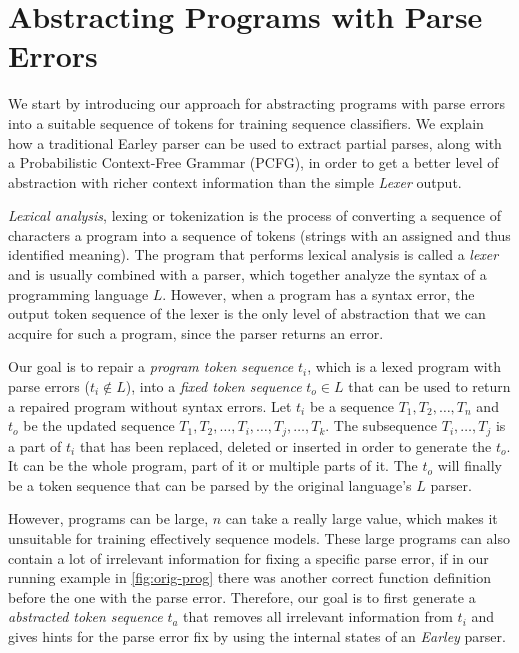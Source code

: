 \section{Abstracting Programs with Parse Errors}
\label{sec:prog-abstract}

We start by introducing our approach for abstracting programs with parse errors
into a suitable sequence of tokens for training sequence classifiers. We explain
how a traditional Earley parser can be used to extract partial parses, along
with a Probabilistic Context-Free Grammar (PCFG), in order to get a better level
of abstraction with richer context information than the simple \emph{Lexer}
output.



\emph{Lexical analysis}, lexing or tokenization is the process of converting a
sequence of characters \ie a program into a sequence of tokens (strings with an
assigned and thus identified meaning). The program that performs lexical
analysis is called a \emph{lexer} and is usually combined with a parser, which
together analyze the syntax of a programming language $L$. However, when a
program has a syntax error, the output token sequence of the lexer is the only
level of abstraction that we can acquire for such a program, since the parser
returns an error.

Our goal is to repair a \emph{program token sequence} $t_i$, which is a lexed
program with parse errors (\ie $t_i \notin L$), into a \emph{fixed token
sequence} $t_o \in L$ that can be used to return a repaired program without
syntax errors. Let $t_i$ be a sequence $T_1, T_2, \dots, T_n$ and $t_o$ be the
updated sequence $T_1, T_2, \dots, T_i, \dots, T_j, \dots, T_k$. The subsequence
$T_i, \dots, T_j$ is a part of $t_i$ that has been replaced, deleted or inserted
in order to generate the $t_o$. It can be the whole program, part of it or
multiple parts of it. The $t_o$ will finally be a token sequence that can be
parsed by the original language's $L$ parser.

However, programs can be large, \ie $n$ can take a really large value, which
makes it unsuitable for training effectively sequence models. These large
programs can also contain a lot of irrelevant information for fixing a specific
parse error, \eg if in our running example in \autoref{fig:orig-prog} there was
another correct function definition before the one with the parse error.
Therefore, our goal is to first generate a \emph{abstracted token sequence}
$t_a$ that removes all irrelevant information from $t_i$ and gives hints for the
parse error fix by using the internal states of an \emph{Earley} parser.


